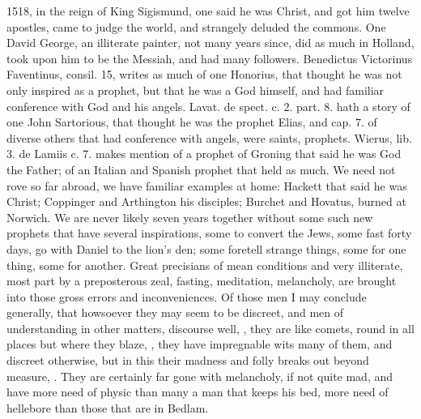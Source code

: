 {1518, in the reign of King Sigismund, one said he was Christ, and got
him twelve apostles, came to judge the world, and strangely deluded the
commons. One David George, an illiterate painter, not many years
since, did as much in Holland, took upon him to be the Messiah, and had
many followers. Benedictus Victorinus Faventinus, \textlatin{consil. 15}, writes as
much of one Honorius, that thought he was not only inspired as a
prophet, but that he was a God himself, and had familiar
conference with God and his angels. Lavat. \textlatin{de spect. c. 2. part. 8}.
hath a story of one John Sartorious, that thought he was the prophet
Elias, and \textlatin{cap. 7.} of diverse others that had conference with angels,
were saints, prophets. Wierus, \textlatin{lib. 3. de Lamiis c. 7.} makes mention of
a prophet of Groning that said he was God the Father; of an Italian and
Spanish prophet that held as much. We need not rove so far abroad, we
have familiar examples at home: Hackett that said he was Christ;
Coppinger and Arthington his disciples; Burchet and Hovatus,
burned at Norwich. We are never likely seven years together without
some such new prophets that have several inspirations, some to convert
the Jews, some fast forty days, go with Daniel to the lion's den; some
foretell strange things, some for one thing, some for another. Great
precisians of mean conditions and very illiterate, most part by a
preposterous zeal, fasting, meditation, melancholy, are brought into
those gross errors and inconveniences. Of those men I may conclude
generally, that howsoever they may seem to be discreet, and men of
understanding in other matters, discourse well, , they are like comets, round in all places but where they
blaze, , they have impregnable wits many of them, and
discreet otherwise, but in this their madness and folly breaks out
beyond measure, . They are certainly far
gone with melancholy, if not quite mad, and have more need of physic
than many a man that keeps his bed, more need of hellebore than those
that are in Bedlam.

}
